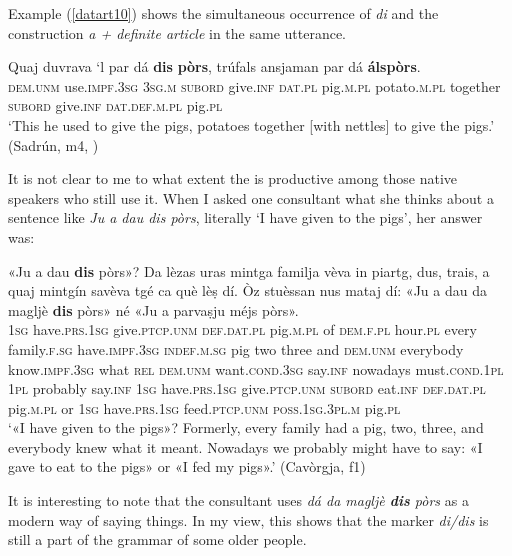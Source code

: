 Example (\ref{datart10}) shows the simultaneous occurrence of \textit{di} and the  construction \textit{a + definite article} in the same utterance.

\ea\label{datart10}
\gll   Quaj duvrava `l par dá \textbf{dis} \textbf{pòrs}, trúfals ansjaman par 
dá \textbf{áls}\footnotemark \textbf{pòrs}. \\
\textsc{dem.unm} use.\textsc{impf.3sg} \textsc{3sg.m} \textsc{subord} give.\textsc{inf} \textsc{dat.pl} pig.\textsc{m.pl} potato.\textsc{m.pl} together \textsc{subord} give.\textsc{inf}  \textsc{dat.def.m.pl} pig.\textsc{pl} \\
\glt `This he used to give the pigs, potatoes together [with nettles] to give the pigs.' (Sadrún, m4, )
\z
 
It is not clear to me to what extent the  is productive among those native speakers who still use it. When I asked one consultant what she thinks about a sentence like \textit{Ju a dau dis pòrs}, literally `I have given to the pigs', her answer was:

\ea\label{datart11}
\gll «Ju a dau \textbf{dis} pòrs»? Da lèzas uras mintga familja vèva in piartg, dus, trais, a quaj mintgín savèva tgé ca què lèṣ dí. Òz stuèssan nus mataj dí: «Ju a dau da magljè \textbf{dis} pòrs» né «Ju a parvaṣju méjs pòrs». \\
\textsc{1sg} have.\textsc{prs.1sg} give.\textsc{ptcp.unm} \textsc{def.dat.pl} pig.\textsc{m.pl} of \textsc{dem.f.pl} hour.\textsc{pl} every family.\textsc{f.sg} have.\textsc{impf.3sg} \textsc{indef.m.sg} pig two three and  \textsc{dem.unm} everybody know.\textsc{impf.3sg} what \textsc{rel}  \textsc{dem.unm} want.\textsc{cond.3sg} say.\textsc{inf} nowadays must.\textsc{cond.1pl} \textsc{1pl} probably  say.\textsc{inf} \textsc{1sg} have.\textsc{prs.1sg} give.\textsc{ptcp.unm}  \textsc{subord} eat.\textsc{inf} \textsc{def.dat.pl} pig.\textsc{m.pl} or  \textsc{1sg} have.\textsc{prs.1sg} feed.\textsc{ptcp.unm} \textsc{poss.1sg.3pl.m} pig.\textsc{pl}\\
\glt `«I have given to the pigs»? Formerly, every family had a pig, two, three, and everybody knew what it meant. Nowadays we probably might have to say: «I gave to eat to the pigs» or «I fed my pigs».' (Cavòrgja, f1)
\z

It is interesting to note that the consultant uses \textit{dá da magljè \textbf{dis} pòrs} as a modern way of saying things. In my view, this shows that the marker \textit{di/dis} is still a part of the grammar of some older people.

